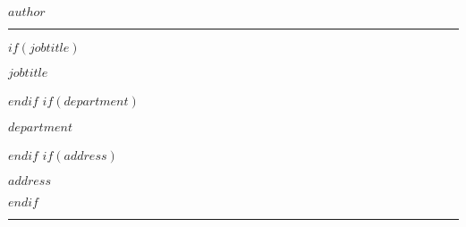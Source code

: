 \centerline{\huge $author$}

\vspace{2 mm}

\hrule

\vspace{2 mm}

$if(jobtitle)$\centerline{$jobtitle$}$endif$
$if(department)$\centerline{$department$}$endif$
$if(address)$\centerline{$address$}$endif$

\vspace{2 mm}

\hrule
